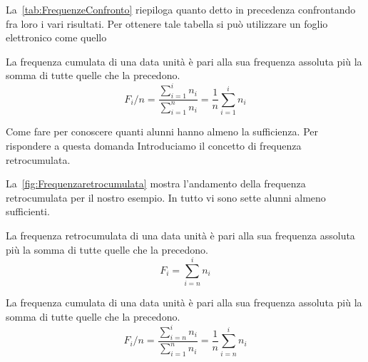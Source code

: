 La~\vref{tab:FrequenzeConfronto} riepiloga quanto detto in precedenza confrontando fra loro i vari risultati. Per ottenere tale tabella si può utilizzare un foglio elettronico come quello~
\begin{defn}
	La frequenza cumulata di una data unità è pari alla sua frequenza assoluta più la somma di tutte quelle che la  precedono.\[F_{i}/n=\dfrac{\sum_{i=1}^{i}n_{i}}{\sum_{i=1}^{n}n_{i}}=\dfrac{1}{n}\sum_{i=1}^{i}n_{i}\]
\end{defn}
Come fare per conoscere quanti alunni hanno almeno la sufficienza. Per rispondere a questa domanda Introduciamo il concetto di frequenza retrocumulata.\par  La~\vref{fig:Frequenzaretrocumulata} mostra l'andamento della frequenza retrocumulata per il nostro esempio. In tutto vi sono sette alunni almeno sufficienti.
\begin{defn}
	La frequenza retrocumulata di una data unità è pari alla sua frequenza assoluta più la somma di tutte quelle che la  precedono.\[F_{i}=\sum_{i=n}^{i}n_{i}\]
\end{defn}

\begin{defn}
	La frequenza cumulata di una data unità è pari alla sua frequenza assoluta più la somma di tutte quelle che la  precedono.\[F_{i}/n=\dfrac{\sum_{i=n}^{i}n_{i}}{\sum_{i=1}^{n}n_{i}}=\dfrac{1}{n}\sum_{i=n}^{i}n_{i}\]
\end{defn}
 
